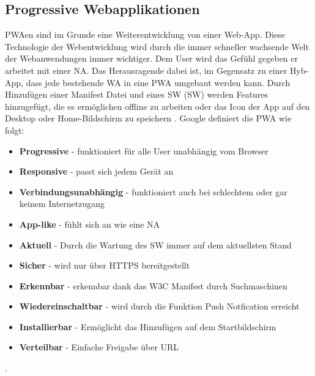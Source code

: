 \subsection{Progressive Webapplikationen}\label{chap:ProgressiveWebapplikationen}
\acl{PWA}en sind im Grunde eine Weiterentwicklung von einer \acs{Web-App}. Diese Technologie der Webentwicklung wird durch die immer schneller wachsende Welt der Webanwendungen immer wichtiger. 
Dem User wird das Gefühl gegeben er arbeitet mit einer \acs{NA}. Das Herausragende dabei ist, im Gegensatz zu einer \acs{Hyb-App}, dass jede bestehende \acs{WA} in eine \acs{PWA} umgebaut werden kann.
Durch Hinzufügen einer Manifest Datei und eines \acl{SW} (\acs{SW}) werden Features hinzugefügt, die es ermöglichen offline zu arbeiten oder das Icon der App auf den Desktop oder Home-Bildschirm zu speichern \cite{PWA}.
Google definiert die \acs{PWA} wie folgt:
\begin{itemize}
    \item  \textbf{Progressive} - funktioniert für alle User unabhängig vom Browser
	\item  \textbf{Responsive} - passt sich jedem Gerät an	
	\item  \textbf{Verbindungsunabhängig} - funktioniert auch bei schlechtem oder gar keinem Internetzugang
	\item  \textbf{App-like} - fühlt sich an wie eine \acs{NA}
	\item  \textbf{Aktuell} - Durch die Wartung des \acs{SW} immer auf dem aktuellsten Stand
	\item  \textbf{Sicher} - wird nur über HTTPS bereitgestellt
	\item  \textbf{Erkennbar} - erkennbar dank das W3C Manifest durch Suchmaschinen
	\item  \textbf{Wiedereinschaltbar} - wird durch die Funktion Push Notfication erreicht
	\item  \textbf{Installierbar} - Ermöglicht das Hinzufügen auf dem Startbildschirm
	\item  \textbf{Verteilbar } - Einfache Freigabe über URL \cite{PWAAdjectives}
\end{itemize}. 


